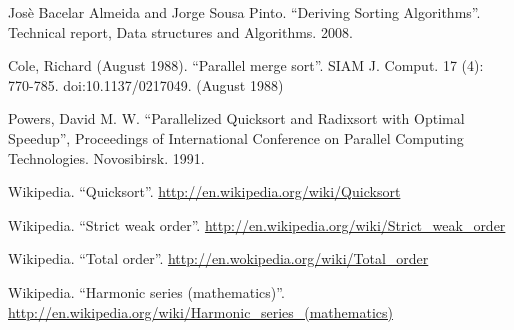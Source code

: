 \documentclass{ctexart}
\begin{document}
\begin{thebibliography}{99}
Jos\`{e} Bacelar Almeida and Jorge Sousa Pinto. ``Deriving Sorting Algorithms''. Technical report, Data structures and Algorithms. 2008.

Cole, Richard (August 1988). ``Parallel merge sort''. SIAM J. Comput. 17 (4): 770-785. doi:10.1137/0217049. (August 1988)

Powers, David M. W. ``Parallelized Quicksort and Radixsort with Optimal Speedup'', Proceedings of International Conference on Parallel Computing Technologies. Novosibirsk. 1991.

Wikipedia. ``Quicksort''. \url{http://en.wikipedia.org/wiki/Quicksort}

Wikipedia. ``Strict weak order''. \url{http://en.wikipedia.org/wiki/Strict_weak_order}

Wikipedia. ``Total order''. \url{http://en.wokipedia.org/wiki/Total_order}

Wikipedia. ``Harmonic series (mathematics)''. \url{http://en.wikipedia.org/wiki/Harmonic_series_(mathematics)}

\end{thebibliography}
\end{document}
